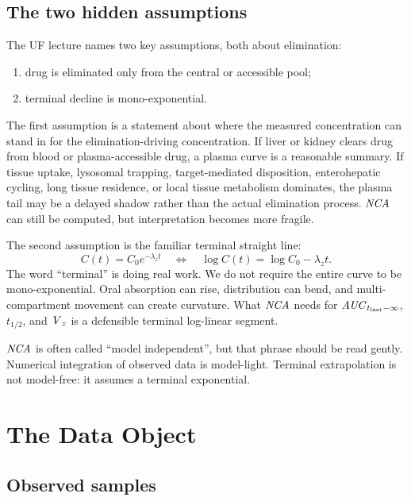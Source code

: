 \documentclass[a4paper]{article}
\newcommand{\Vz}{\ensuremath{\pksym{V}_z}}
\newcommand{\AUC}{\ensuremath{\pksym{AUC}}}
\newcommand{\Tlast}{\ensuremath{t_{\pklab{last}}}}
\newcommand{\lambdaZ}{\ensuremath{\lambda_z}}
\newcommand{\halfLife}{\ensuremath{t_{1/2}}}
\newcommand{\NCA}{\ensuremath{\pksym{NCA}}}
\begin{document}
\subsection{The two hidden assumptions}

The UF lecture names two key assumptions, both about elimination:
\begin{enumerate}[leftmargin=2em]
  \item drug is eliminated only from the central or accessible pool;
  \item terminal decline is mono-exponential.
\end{enumerate}

The first assumption is a statement about where the measured concentration can stand in for the elimination-driving concentration. If liver or kidney clears drug from blood or plasma-accessible drug, a plasma curve is a reasonable summary. If tissue uptake, lysosomal trapping, target-mediated disposition, enterohepatic cycling, long tissue residence, or local tissue metabolism dominates, the plasma tail may be a delayed shadow rather than the actual elimination process. \NCA{} can still be computed, but interpretation becomes more fragile.

The second assumption is the familiar terminal straight line:
\[
  C(t)=C_0 e^{-\lambdaZ t}
  \quad\Longleftrightarrow\quad
  \log C(t)=\log C_0-\lambdaZ t.
\]
The word ``terminal'' is doing real work. We do not require the entire curve to be mono-exponential. Oral absorption can rise, distribution can bend, and multi-compartment movement can create curvature. What \NCA{} needs for \(\AUC_{\Tlast-\infty}\), \(\halfLife\), and \(\Vz\) is a defensible terminal log-linear segment.

\begin{warning}
  \NCA{} is often called ``model independent'', but that phrase should be read gently. Numerical integration of observed data is model-light. Terminal extrapolation is not model-free: it assumes a terminal exponential.
\end{warning}

\section{The Data Object}

\subsection{Observed samples}
\end{document}
